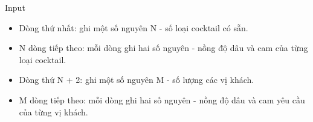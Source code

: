 Input  
\begin{itemize}
	\item     Dòng thứ nhất: ghi một số nguyên N - số loại cocktail có sẵn.   
	\item     N dòng tiếp theo: mỗi dòng ghi hai số nguyên - nồng độ dâu và cam của từng loại cocktail.   
	\item     Dòng thứ N + 2: ghi một số nguyên M - số lượng các vị khách.   
	\item     M dòng tiếp theo: mỗi dòng ghi hai số nguyên - nồng độ dâu và cam yêu cầu của từng vị khách.   
\end{itemize}